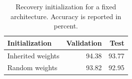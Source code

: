 \begin{table}[t]
  \centering
  \caption{Recovery initialization for a fixed architecture.
    Accuracy is reported in percent.}
  \label{tab:ablation-weights}
  \begin{tabular}{@{}lrr@{}}
    \toprule
    Initialization & Validation & Test \\
    \midrule
    Inherited weights & 94.38 & 93.77 \\
    Random weights & 93.82 & 92.95 \\
    \bottomrule
  \end{tabular}
\end{table}

